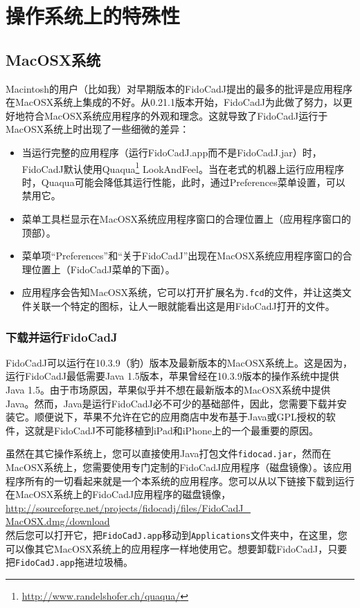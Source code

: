 \documentclass[10pt,a4paper,twoside]{scrreprt}
\begin{document}
\chapter{操作系统上的特殊性} \label{specifics} 

\section{MacOSX系统}

Macintosh的用户（比如我）对早期版本的FidoCadJ提出的最多的批评是应用程序在MacOSX系统上集成的不好。从0.21.1版本开始，FidoCadJ为此做了努力，以更好地符合MacOSX系统应用程序的外观和理念。这就导致了FidoCadJ运行于MacOSX系统上时出现了一些细微的差异：
\begin{itemize}
\item 当运行完整的应用程序（运行FidoCadJ.app而不是FidoCadJ.jar）时，FidoCadJ默认使用Quaqua\footnote{\href{http://www.randelshofer.ch/quaqua/}{http://www.randelshofer.ch/quaqua/}} LookAndFeel。当在老式的机器上运行应用程序时，Quaqua可能会降低其运行性能，此时，通过Preferences菜单设置，可以禁用它。
\item 菜单工具栏显示在MacOSX系统应用程序窗口的合理位置上（应用程序窗口的顶部）。
\item 菜单项{}“Preferences”和{}“关于FidoCadJ”出现在MacOSX系统应用程序窗口的合理位置上（FidoCadJ菜单的下面）。
\item 应用程序会告知MacOSX系统，它可以打开扩展名为\lstinline!.fcd!的文件，并让这类文件关联一个特定的图标，让人一眼就能看出这是用FidoCadJ打开的文件。
\end{itemize}

\subsection{下载并运行FidoCadJ}
FidoCadJ可以运行在10.3.9（豹）版本及最新版本的MacOSX系统上。这是因为，运行FidoCadJ最低需要Java 1.5版本，苹果曾经在10.3.9版本的操作系统中提供Java 1.5。由于市场原因，苹果似乎并不想在最新版本的MacOSX系统中提供Java。然而，Java是运行FidoCadJ必不可少的基础部件，因此，您需要下载并安装它。顺便说下，苹果不允许在它的应用商店中发布基于Java或GPL授权的软件，这就是FidoCadJ不可能移植到iPad和iPhone上的一个最重要的原因。

虽然在其它操作系统上，您可以直接使用Java打包文件\lstinline!fidocad.jar!，然而在MacOSX系统上，您需要使用专门定制的FidoCadJ应用程序（磁盘镜像）。该应用程序所有的一切看起来就是一个本系统的应用程序。您可以从以下链接下载到运行在MacOSX系统上的FidoCadJ应用程序的磁盘镜像，\\
 {\small \href{http://sourceforge.net/projects/fidocadj/files/FidoCadJ_MacOSX.dmg/download}{http://sourceforge.net/projects/fidocadj/files/FidoCadJ\_ MacOSX.dmg/download}}\\
然后您可以打开它，把\lstinline!FidoCadJ.app!移动到\lstinline!Applications!文件夹中，在这里，您可以像其它MacOSX系统上的应用程序一样地使用它。想要卸载FidoCadJ，只要把\lstinline!FidoCadJ.app!拖进垃圾桶。
\end{document}
